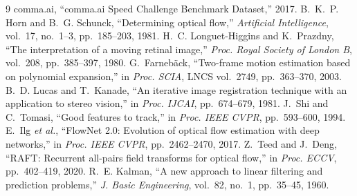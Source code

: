 \documentclass[10pt,twocolumn]{article}
\begin{document}
\clearpage
\begin{thebibliography}{9}
\footnotesize
{} comma.ai, ``comma.ai Speed Challenge Benchmark Dataset,'' 2017.
 B.~K.~P. Horn and B.~G. Schunck, ``Determining optical flow,'' \emph{Artificial Intelligence}, vol.~17, no.~1--3, pp.~185--203, 1981.
 H.~C. Longuet-Higgins and K.~Prazdny, ``The interpretation of a moving retinal image,'' \emph{Proc. Royal Society of London B}, vol.~208, pp.~385--397, 1980.
 G.~Farneb\"{a}ck, ``Two-frame motion estimation based on polynomial expansion,'' in \emph{Proc. SCIA}, LNCS vol.~2749, pp.~363--370, 2003.
 B.~D. Lucas and T.~Kanade, ``An iterative image registration technique with an application to stereo vision,'' in \emph{Proc. IJCAI}, pp.~674--679, 1981.
 J.~Shi and C.~Tomasi, ``Good features to track,'' in \emph{Proc. IEEE CVPR}, pp.~593--600, 1994.
 E.~Ilg \emph{et al.}, ``FlowNet 2.0: Evolution of optical flow estimation with deep networks,'' in \emph{Proc. IEEE CVPR}, pp.~2462--2470, 2017.
 Z.~Teed and J.~Deng, ``RAFT: Recurrent all-pairs field transforms for optical flow,'' in \emph{Proc. ECCV}, pp.~402--419, 2020.
 R.~E. Kalman, ``A new approach to linear filtering and prediction problems,'' \emph{J. Basic Engineering}, vol.~82, no.~1, pp.~35--45, 1960.
\end{thebibliography}
\end{document}
